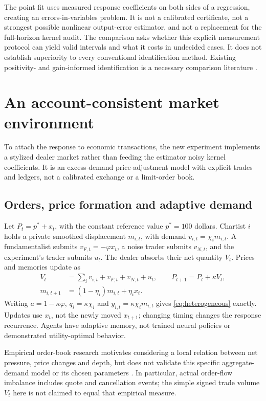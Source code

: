 \documentclass[11pt,a4paper]{article}
\theoremstyle{definition}
\theoremstyle{remark}
\begin{document}
The point fit uses measured response coefficients on both sides of a regression, creating an errors-in-variables problem. It is not a calibrated certificate, not a strongest possible nonlinear output-error estimator, and not a replacement for the full-horizon kernel audit. The comparison asks whether this explicit measurement protocol can yield valid intervals and what it costs in undecided cases. It does not establish superiority to every conventional identification method. Existing positivity- and gain-informed identification is a necessary comparison literature \citep{khosravi2025,khosravi2022}.

\section{An account-consistent market environment}
\label{sec:economic_measurement}
To attach the response to economic transactions, the new experiment implements a stylized dealer market rather than feeding the estimator noisy kernel coefficients. It is an excess-demand price-adjustment model with explicit trades and ledgers, not a calibrated exchange or a limit-order book.

\subsection{Orders, price formation and adaptive demand}
Let $P_t=p^*+x_t$, with the constant reference value $p^*=100$ dollars. Chartist $i$ holds a private smoothed displacement $m_{i,t}$, with demand $v_{i,t}=\chi_i m_{i,t}$. A fundamentalist submits $v_{F,t}=-\varphi x_t$, a noise trader submits $v_{N,t}$, and the experiment's trader submits $u_t$. The dealer absorbs their net quantity $V_t$. Prices and memories update as
\begin{align}
 V_t&=\sum_i v_{i,t}+v_{F,t}+v_{N,t}+u_t,\qquad
 P_{t+1}=P_t+\kappa V_t,\\
 m_{i,t+1}&=(1-\eta_i)m_{i,t}+\eta_i x_t.
 \label{eq:economic_orders}
\end{align}
Writing $a=1-\kappa\varphi$, $q_i=\kappa\chi_i$ and $y_{i,t}=\kappa\chi_i m_{i,t}$ gives \eqref{eq:heterogeneous} exactly. Updates use $x_t$, not the newly moved $x_{t+1}$; changing timing changes the response recurrence. Agents have adaptive memory, not trained neural policies or demonstrated utility-optimal behavior.

Empirical order-book research motivates considering a local relation between net pressure, price changes and depth, but does not validate this specific aggregate-demand model or its chosen parameters \citep{cont2014}. In particular, actual order-flow imbalance includes quote and cancellation events; the simple signed trade volume $V_t$ here is not claimed to equal that empirical measure.
\end{document}
